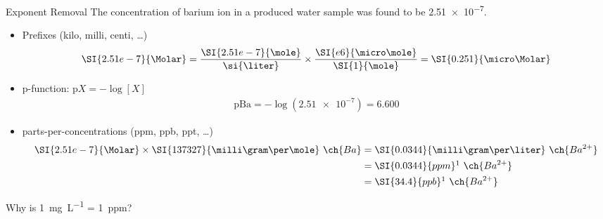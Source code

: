 \documentclass[notes=hide]{beamer}
\begin{document}
\begin{frame}{Exponent Removal}
	The concentration of barium ion in a produced water sample was found to
	be \SI{2.51e-7}{\Molar}.

	\begin{itemize}[<+->]
		\item Prefixes (kilo, milli, centi, \ldots)
			\begin{align*}
				\SI{2.51e-7}{\Molar} =
				\dfrac{\SI{2.51e-7}{\mole}}{\si{\liter}}
				\times
				\dfrac{\SI{e6}{\micro\mole}}{\SI{1}{\mole}} =
				\SI{0.251}{\micro\Molar}
			\end{align*}
		\item p-function: $\text{p}X = -\log [X]$
			\begin{align*}
				\text{pBa} = -\log(\num{2.51e-7}) = 6.600
			\end{align*}
		\item parts-per-concentrations (ppm, ppb, ppt, \ldots)
			\begin{align*}
				\SI{2.51e-7}{\Molar} \times
				\SI{137327}{\milli\gram\per\mole}~\ch{Ba} &=
				\SI{0.0344}{\milli\gram\per\liter}~\ch{Ba^{2+}}
				\\
				&= \SI{0.0344}{ppm}\footnotemark[1]~\ch{Ba^{2+}} \\
				&= \SI{34.4}{ppb}\footnotemark[1]~\ch{Ba^{2+}}
			\end{align*}

	\end{itemize}
\end{frame}

\begin{frame}{Why is \SI{1}{\milli\gram\per\liter} = \SI{1}{ppm}?}


\end{frame}
\end{document}
